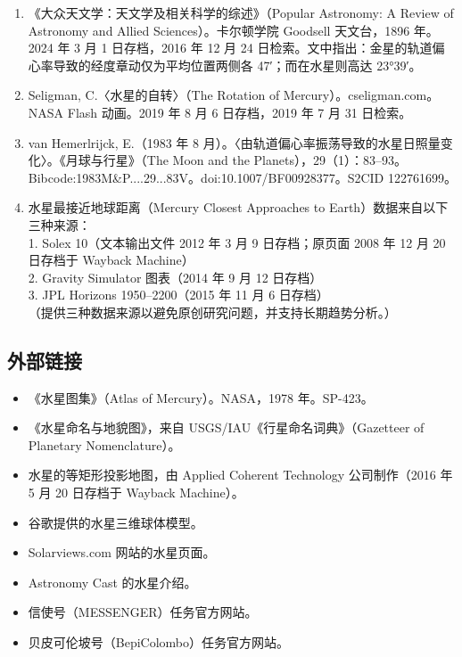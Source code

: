 \begin{enumerate}
    \item 《大众天文学：天文学及相关科学的综述》（Popular Astronomy: A Review of Astronomy and Allied Sciences）。卡尔顿学院 Goodsell 天文台，1896 年。2024 年 3 月 1 日存档，2016 年 12 月 24 日检索。文中指出：金星的轨道偏心率导致的经度章动仅为平均位置两侧各 47′；而在水星则高达 23°39′。
    \item Seligman, C.〈水星的自转〉（The Rotation of Mercury）。cseligman.com。NASA Flash 动画。2019 年 8 月 6 日存档，2019 年 7 月 31 日检索。
    \item van Hemerlrijck, E.（1983 年 8 月）。〈由轨道偏心率振荡导致的水星日照量变化〉。《月球与行星》（The Moon and the Planets），29（1）：83–93。Bibcode:1983M&P....29...83V。doi:10.1007/BF00928377。S2CID 122761699。
    \item 水星最接近地球距离（Mercury Closest Approaches to Earth）数据来自以下三种来源：\\
    1. Solex 10（文本输出文件 2012 年 3 月 9 日存档；原页面 2008 年 12 月 20 日存档于 Wayback Machine）\\
    2. Gravity Simulator 图表（2014 年 9 月 12 日存档）\\
    3. JPL Horizons 1950–2200（2015 年 11 月 6 日存档）\\
   （提供三种数据来源以避免原创研究问题，并支持长期趋势分析。）

\end{enumerate}
\subsection{外部链接}
\begin{itemize}
\item 《水星图集》（Atlas of Mercury）。NASA，1978 年。SP-423。
\item 《水星命名与地貌图》，来自 USGS/IAU《行星命名词典》（Gazetteer of Planetary Nomenclature）。
\item 水星的等矩形投影地图，由 Applied Coherent Technology 公司制作（2016 年 5 月 20 日存档于 Wayback Machine）。
\item 谷歌提供的水星三维球体模型。
\item Solarviews.com 网站的水星页面。
\item Astronomy Cast 的水星介绍。
\item 信使号（MESSENGER）任务官方网站。
\item 贝皮可伦坡号（BepiColombo）任务官方网站。
\end{itemize}











